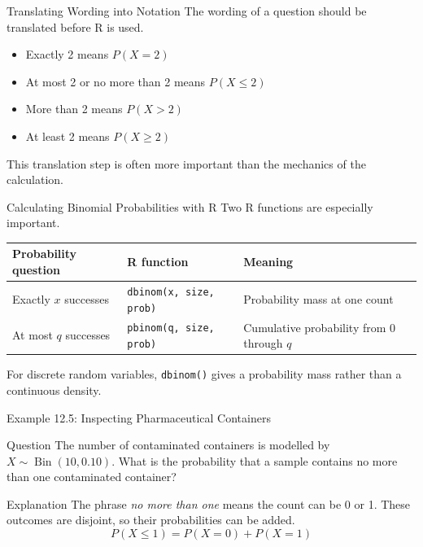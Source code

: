 \documentclass[aspectratio=169]{beamer}
\begin{document}
\begin{frame}{Translating Wording into Notation}
The wording of a question should be translated before R is used.
\begin{itemize}
	\item Exactly 2 means $P(X=2)$
  	\item At most 2 or no more than 2 means $P(X\le 2)$
  	\item More than 2 means $P(X>2)$
  	\item At least 2 means $P(X\ge 2)$
\end{itemize}

This translation step is often more important than the mechanics of the calculation.
\end{frame}

\begin{frame}{Calculating Binomial Probabilities with R}
Two R functions are especially important.

\begin{table}
\centering
\small
\begin{tabularx}{\textwidth}{>{\RaggedRight\arraybackslash}p{} >{\RaggedRight\arraybackslash}p{} X}
\toprule
Probability question & R function & Meaning \\
\midrule
Exactly $x$ successes & \texttt{dbinom(x, size, prob)} & Probability mass at one count \\
At most $q$ successes & \texttt{pbinom(q, size, prob)} & Cumulative probability from 0 through $q$ \\
\bottomrule
\end{tabularx}
\end{table}

For discrete random variables, \texttt{dbinom()} gives a probability mass rather than a continuous density.
\end{frame}

\begin{frame}{Example 12.5: Inspecting Pharmaceutical Containers}
\begin{block}{Question}
The number of contaminated containers is modelled by $X \sim \operatorname{Bin}(10,0.10)$. What is the probability that a sample contains no more than one contaminated container?
\end{block}

\begin{block}{Explanation}
The phrase \textit{no more than one} means the count can be 0 or 1. These outcomes are disjoint, so their probabilities can be added.
$$P(X\le 1)=P(X=0)+P(X=1)$$
\end{block}
\end{frame}
\end{document}
